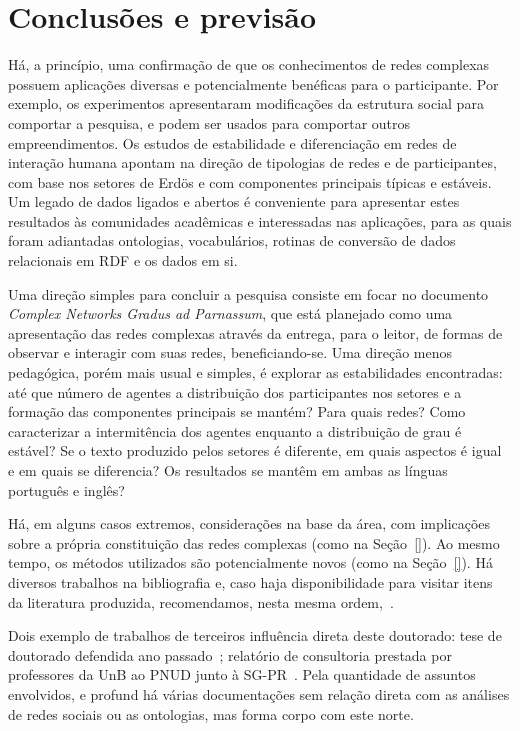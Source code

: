 \documentclass[a4paper,openright,12pt]{report} %
\begin{document}
\chapter{Conclusões e previsão}\label{sec:con}
Há, a princípio, uma confirmação de que os conhecimentos de redes complexas
possuem aplicações diversas e potencialmente benéficas para o participante.
Por exemplo, os experimentos apresentaram modificações da estrutura social para comportar a pesquisa, e podem ser usados para comportar outros empreendimentos. Os estudos de estabilidade e diferenciação em redes de interação humana apontam na direção de tipologias de redes e de participantes, com base nos setores de Erdös e com componentes principais típicas e estáveis.
Um legado de dados ligados e abertos é conveniente para apresentar estes resultados às comunidades acadêmicas e interessadas nas aplicações, para as quais foram adiantadas ontologias, vocabulários, rotinas de conversão de dados relacionais em RDF e os dados em si.

Uma direção simples para concluir a pesquisa
consiste em focar no documento \emph{Complex Networks Gradus ad Parnassum},
que está planejado como uma apresentação das redes complexas através
da entrega, para o leitor, de formas de observar e interagir com suas redes, beneficiando-se.
Uma direção menos pedagógica, porém mais usual e simples, é
explorar as estabilidades encontradas: até que número de
agentes a distribuição dos participantes nos setores e a
formação das componentes principais se mantém? Para quais redes?
Como caracterizar a intermitência dos agentes enquanto a distribuição de
grau é estável? Se o texto produzido pelos setores é diferente,
em quais aspectos é igual e em quais se diferencia?
Os resultados se mantêm em ambas as línguas português e inglês?

Há, em alguns casos extremos, considerações na base da área,
com implicações sobre a própria constituição das redes complexas
(como na Seção~\ref{}).
Ao mesmo tempo, os métodos utilizados são potencialmente novos (como na Seção~\ref{}).
Há diversos trabalhos na bibliografia e,
caso haja disponibilidade para visitar itens da literatura
produzida, recomendamos, nesta mesma ordem,~\cite{timeS,pnud5,ensaioAA,gmane,fourHubs}.

Dois exemplo de trabalhos de terceiros influência direta deste doutorado:
tese de doutorado defendida ano passado~\cite{chandra};
relatório de consultoria prestada por professores da UnB ao PNUD
junto à SG-PR~\cite{paulo6}. Pela quantidade de assuntos envolvidos,
e profund
há várias documentações sem relação direta com as análises
de redes sociais ou as ontologias, mas forma corpo com este norte.
\end{document}
